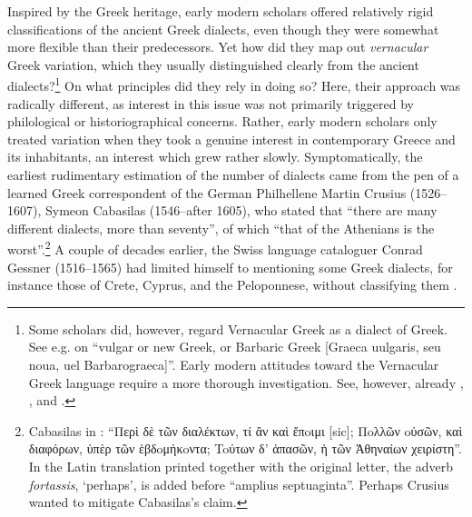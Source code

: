 Inspired by the Greek heritage, early modern scholars offered relatively rigid classifications of the ancient Greek dialects, even though they were somewhat more flexible than their predecessors. Yet how did they map out \textit{vernacular} Greek variation, which they usually distinguished clearly from the ancient dialects?\footnote{Some scholars did, however, regard Vernacular Greek as a dialect of Greek. See e.g. \citet[{\footnotesize{)(}}.7\textsc{\textsuperscript{v}}]{Megiser1603} on “vulgar or new Greek, or Barbaric Greek [Graeca uulgaris, seu noua, uel Barbarograeca]”. Early modern attitudes toward the Vernacular Greek language require a more thorough investigation. See, however, already \citet{Caratzas1952}, \citet{Rotolo1973}, and \citet{Toufexis2005}.} On what principles did they rely in doing so? Here, their approach was radically different, as interest in this issue was not primarily triggered by philological or historiographical concerns. Rather, early modern scholars only treated  variation when they took a genuine interest in contemporary Greece and its inhabitants, an interest which grew rather slowly. Symptomatically, the earliest rudimentary estimation of the number of  dialects came from the pen of a learned Greek correspondent of the German Philhellene Martin Crusius (1526–1607), Symeon Cabasilas (1546–after 1605), who stated that “there are many different dialects, more than seventy”, of which “that of the Athenians is the worst”.\footnote{Cabasilas in \citet[461]{Crusius1584}: “Περὶ δὲ τῶν διαλέκτων, τί ἂν καὶ ἔπoιμι [sic]; Πoλλῶν oὐσῶν, καὶ διαφόρων, ὑπὲρ τῶν ἑβδoμήκoντα; Toύτων δ' ἁπασῶν, ἡ τῶν Ἀθηναίων χειρίστη”. In the Latin translation printed together with the original letter, the adverb \textit{fortassis}, ‘perhaps’, is added before “amplius septuaginta”. Perhaps Crusius wanted to mitigate Cabasilas’s claim.} A couple of decades earlier, the Swiss language cataloguer Conrad Gessner (1516–1565) had limited himself to mentioning some  Greek dialects, for instance those of Crete, Cyprus, and the Peloponnese, without classifying them \citep[47\textsc{\textsuperscript{r}}]{Gessner1555}.

